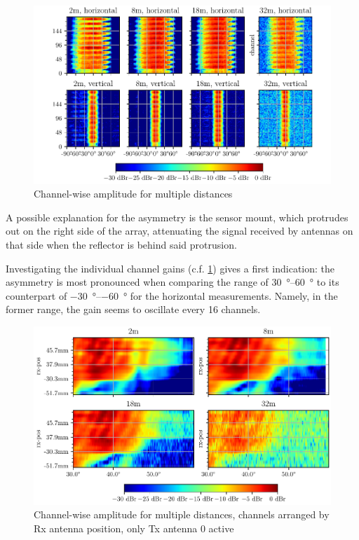 \begin{figure}
  \centering
  \includegraphics[width=\textwidth]{../figures/channel_amp.pdf}
  \caption{Channel-wise amplitude for multiple distances}
  \label{fig:chan_amp}
\end{figure}

A possible explanation for the asymmetry is the sensor mount,
which protrudes out on the right side of the array,
attenuating the signal received by antennas on that side when the reflector is behind said protrusion.

Investigating the individual channel gains (c.f. \ref{fig:chan_amp}) gives a first indication:
the asymmetry is most pronounced when comparing the range of \SIrange{30}{60}{\degree}
to its counterpart of \SIrange{-30}{-60}{\degree} for the horizontal measurements.
Namely, in the former range, the gain seems to oscillate every 16 channels.

\begin{figure}
  \centering
  \includegraphics[width=\textwidth]{../figures/channel_amp_tx0.pdf}
  \caption{Channel-wise amplitude for multiple distances, channels arranged by Rx antenna position, only Tx antenna 0 active}
  \label{fig:chan_amp_tx0}
\end{figure}

